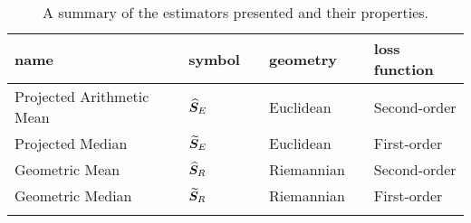 \begin{table}[h]
\caption{A summary of the estimators presented and their properties.  \label{tab:ests.sum}}
\begin{center}
\begin{tabular}{ lclclcl}\hline
\rule[2mm]{0mm}{1mm} \textbf{name} & & \textbf{symbol} & & \textbf{geometry} &&\textbf{loss function}\\ \hline \hline 
\rule[2mm]{0mm}{6mm} Projected Arithmetic Mean & & ${\widehat{\bm S}_E}$ & & Euclidean &&Second-order  \\
\rule[2mm]{0mm}{6mm} Projected Median & & ${\widetilde{\bm S}_E}$ & & Euclidean && First-order \\
\rule[2mm]{0mm}{6mm} Geometric Mean & & ${\widehat{\bm S}_R}$&  & Riemannian && Second-order\\
\rule[2mm]{0mm}{6mm} Geometric Median & & ${\widetilde{\bm S}_R}$&  & Riemannian &&First-order \\[-7mm] 
\rule[2mm]{0mm}{6mm} & & & & \\ \hline
\end{tabular}
\end{center}
\end{table}

